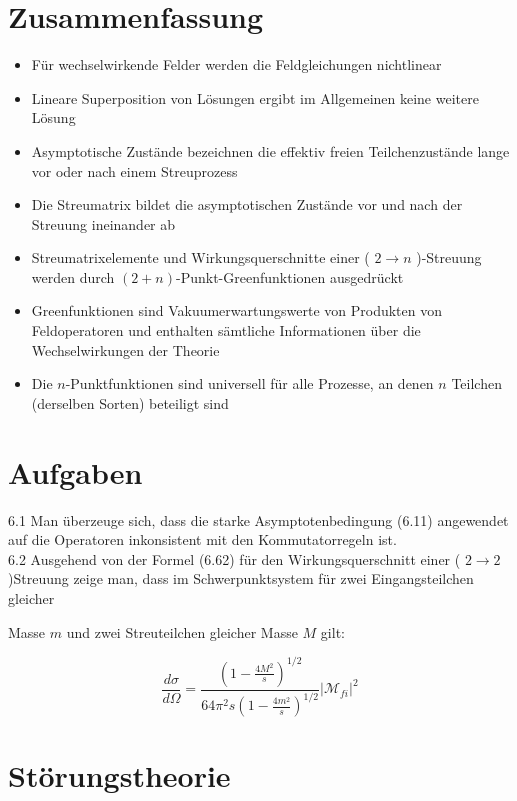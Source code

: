 \documentclass[10pt, letterpaper]{article}
\begin{document}
\section*{Zusammenfassung}
\begin{itemize}
  \item Für wechselwirkende Felder werden die Feldgleichungen nichtlinear
  \item Lineare Superposition von Lösungen ergibt im Allgemeinen keine weitere Lösung
  \item Asymptotische Zustände bezeichnen die effektiv freien Teilchenzustände lange vor oder nach einem Streuprozess
  \item Die Streumatrix bildet die asymptotischen Zustände vor und nach der Streuung ineinander ab
  \item Streumatrixelemente und Wirkungsquerschnitte einer ( $2 \longrightarrow n$ )-Streuung werden durch $(2+n)$-Punkt-Greenfunktionen ausgedrückt
  \item Greenfunktionen sind Vakuumerwartungswerte von Produkten von Feldoperatoren und enthalten sämtliche Informationen über die Wechselwirkungen der Theorie
  \item Die $n$-Punktfunktionen sind universell für alle Prozesse, an denen $n$ Teilchen (derselben Sorten) beteiligt sind
\end{itemize}

\section*{Aufgaben}
6.1 Man überzeuge sich, dass die starke Asymptotenbedingung (6.11) angewendet auf die Operatoren inkonsistent mit den Kommutatorregeln ist.\\
6.2 Ausgehend von der Formel (6.62) für den Wirkungsquerschnitt einer ( $2 \rightarrow 2$ )Streuung zeige man, dass im Schwerpunktsystem für zwei Eingangsteilchen gleicher

Masse $m$ und zwei Streuteilchen gleicher Masse $M$ gilt:

$$
\frac{d \sigma}{d \Omega}=\frac{\left(1-\frac{4 M^{2}}{s}\right)^{1 / 2}}{64 \pi^{2} s\left(1-\frac{4 m^{2}}{s}\right)^{1 / 2}}\left|\mathcal{M}_{f i}\right|^{2}
$$

\section*{Störungstheorie}
\end{document}
